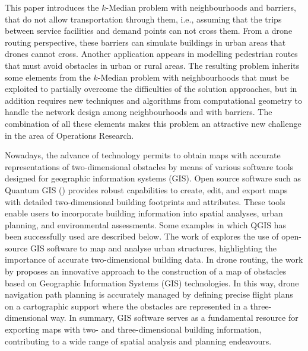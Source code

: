 \documentclass[a4paper,  review, authoryear, 1p.]{elsarticle}
\newcommand{\JP}[1]{{\color{blue}#1}}
\newcommand{\CV}[1]{{\color{blue}#1}}
\begin{document}
	\JP{This paper introduces the $k$-Median problem with neighbourhoods and barriers, that do not allow transportation through them, i.e.}, assuming that the trips between service facilities and demand points can not cross them. \CV{From a drone routing perspective}, these barriers can simulate buildings in urban areas that drones cannot cross. \JP{Another application appears in modelling  pedestrian routes that  must avoid obstacles in urban or rural areas}. \JP{The resulting problem inherits some elements from the $k$-Median problem with neighbourhoods that must be exploited to partially overcome the difficulties of the solution approaches, but in addition requires new techniques and algorithms  from computational geometry to handle the network design among neighbourhoods and with barriers. The combination of all these elements makes this problem an attractive new challenge in the area of Operations Research. }
	
		
	\CV{
		Nowadays, the advance of technology permits to obtain maps with accurate representations of two-dimensional obstacles by means of various software tools designed for geographic information systems (GIS). Open source software such as Quantum GIS (\cite{qgisdevelopmentteam2009}) provides robust capabilities to create, edit, and export maps with detailed two-dimensional building footprints and attributes. These tools enable users to incorporate building information into spatial analyses, urban planning, and environmental assessments. Some examples in which QGIS has been successfully used are described below. The work of \cite{arsanjani2013} explores the use of open-source GIS software to map and analyse urban structures, highlighting the importance of accurate two-dimensional building data. In drone routing, the work by \cite{mangiameli2013} proposes an innovative approach to the construction of a map of obstacles based on Geographic Information Systems (GIS) technologies. In this way, drone navigation path planning is accurately managed by defining precise flight plans on a cartographic support where the obstacles are represented in a three-dimensional way. In summary, GIS software serves as a fundamental resource for exporting maps with two- and three-dimensional building information, contributing to a wide range of spatial analysis and planning endeavours.}
		
\end{document}

